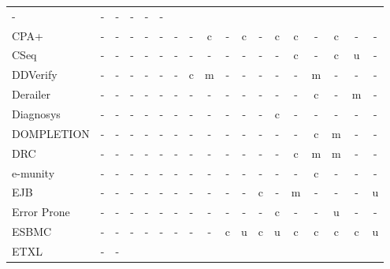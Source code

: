 \begin{longtable}{ l *{17}{c} }
      - &
      - &
      - &
      - &
      - &
      - \\
    CPA+ &
      - &
      - &
      - &
      - &
      - &
      - &
      - &
      c &
      - &
      c &
      - &
      c &
      c &
      - &
      c &
      - &
      - \\
    CSeq &
      - &
      - &
      - &
      - &
      - &
      - &
      - &
      - &
      - &
      - &
      - &
      - &
      c &
      - &
      c &
      u &
      - \\
    DDVerify &
      - &
      - &
      - &
      - &
      - &
      - &
      c &
      m &
      - &
      - &
      - &
      - &
      - &
      m &
      - &
      - &
      - \\
    Derailer &
      - &
      - &
      - &
      - &
      - &
      - &
      - &
      - &
      - &
      - &
      - &
      - &
      - &
      c &
      - &
      m &
      - \\
    Diagnosys &
      - &
      - &
      - &
      - &
      - &
      - &
      - &
      - &
      - &
      - &
      - &
      c &
      - &
      - &
      - &
      - &
      - \\
    DOMPLETION &
      - &
      - &
      - &
      - &
      - &
      - &
      - &
      - &
      - &
      - &
      - &
      - &
      - &
      c &
      m &
      - &
      - \\
    DRC &
      - &
      - &
      - &
      - &
      - &
      - &
      - &
      - &
      - &
      - &
      - &
      - &
      c &
      m &
      m &
      - &
      - \\
    e-munity &
      - &
      - &
      - &
      - &
      - &
      - &
      - &
      - &
      - &
      - &
      - &
      - &
      - &
      c &
      - &
      - &
      - \\
    EJB &
      - &
      - &
      - &
      - &
      - &
      - &
      - &
      - &
      - &
      - &
      c &
      - &
      m &
      - &
      - &
      - &
      u \\
    Error Prone &
      - &
      - &
      - &
      - &
      - &
      - &
      - &
      - &
      - &
      - &
      - &
      c &
      - &
      - &
      u &
      - &
      - \\
    ESBMC &
      - &
      - &
      - &
      - &
      - &
      - &
      - &
      - &
      c &
      u &
      c &
      u &
      c &
      c &
      c &
      c &
      u \\
    ETXL &
      - &
      - &

\end{longtable}
